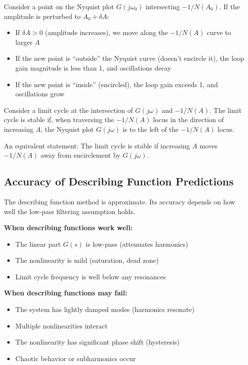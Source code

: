 Consider a point on the Nyquist plot $G(j\omega_0)$ intersecting $-1/N(A_0)$. If the amplitude is perturbed to $A_0 + \delta A$:

\begin{itemize}
    \item If $\delta A > 0$ (amplitude increases), we move along the $-1/N(A)$ curve to larger $A$
    \item If the new point is ``outside'' the Nyquist curve (doesn't encircle it), the loop gain magnitude is less than 1, and oscillations decay
    \item If the new point is ``inside'' (encircled), the loop gain exceeds 1, and oscillations grow
\end{itemize}

\begin{theorem}
\label{thm:lc_stability}
Consider a limit cycle at the intersection of $G(j\omega)$ and $-1/N(A)$. The limit cycle is stable if, when traversing the $-1/N(A)$ locus in the direction of increasing $A$, the Nyquist plot $G(j\omega)$ is to the left of the $-1/N(A)$ locus.
\end{theorem}

An equivalent statement: The limit cycle is stable if increasing $A$ moves $-1/N(A)$ away from encirclement by $G(j\omega)$.

\subsection{Accuracy of Describing Function Predictions}

The describing function method is approximate. Its accuracy depends on how well the low-pass filtering assumption holds.

\textbf{When describing functions work well:}
\begin{itemize}
    \item The linear part $G(s)$ is low-pass (attenuates harmonics)
    \item The nonlinearity is mild (saturation, dead zone)
    \item Limit cycle frequency is well below any resonances
\end{itemize}

\textbf{When describing functions may fail:}
\begin{itemize}
    \item The system has lightly damped modes (harmonics resonate)
    \item Multiple nonlinearities interact
    \item The nonlinearity has significant phase shift (hysteresis)
    \item Chaotic behavior or subharmonics occur
\end{itemize}

